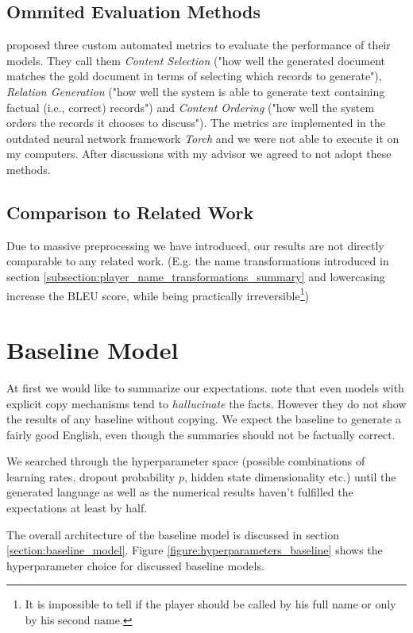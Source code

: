\subsection{Ommited Evaluation Methods}

\citet{wiseman2017} proposed three custom automated metrics to evaluate the performance of their models. They call them \emph{Content Selection} ("how well the generated document matches the gold document in terms of selecting which records to generate"), \emph{Relation Generation} ("how well the system is able to generate text containing factual (i.e., correct) records") and \emph{Content Ordering} ("how well the system orders the records it chooses to discuss"). The metrics are implemented in the outdated neural network framework \emph{Torch} and we were not able to execute it on my computers. After discussions with my advisor we agreed to not adopt these methods.

\subsection{Comparison to Related Work}

Due to massive preprocessing we have introduced, our results are not directly comparable to any related work. (E.g. the name transformations introduced in section \ref{subsection:player_name_transformations_summary} and lowercasing increase the BLEU score, while being practically irreversible\footnote{It is impossible to tell if the player should be called by his full name or only by his second name.})

\section{Baseline Model}

At first we would like to summarize our expectations. \citet{wiseman2017} note that even models with explicit copy mechanisms tend to \emph{hallucinate} the facts. However they do not show the results of any baseline without copying. We expect the baseline to generate a fairly good English, even though the summaries should not be factually correct.

We searched through the hyperparameter space (possible combinations of learning rates, dropout probability $p$, hidden state dimensionality etc.) until the generated language as well as the numerical results haven't fulfilled the expectations at least by half.

The overall architecture of the baseline model is discussed in section \ref{section:baseline_model}. Figure \ref{figure:hyperparameters_baseline} shows the hyperparameter choice for discussed baseline models.

